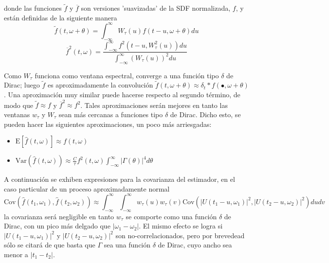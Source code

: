 \documentclass[12pt,a4paper]{mitthesis}
\newcommand{\intR}{\int_{-\infty}^{\infty}}
\newcommand{\dirac}{$\delta$  de Dirac}
\newcommand{\est}[1]{\widehat{ #1 }}
\newcommand{\E}[1]{\mathrm{E}\left[ #1 \right]}
\newcommand{\Var}[1]{\mathrm{Var}\left( #1 \right)}
\newcommand{\Cov}[1]{\mathrm{Cov}\left( #1 \right)}
\newcommand{\abso}[1]{\left| #1 \right|}
\begin{document}
donde las funciones $\widetilde{f}$ y $\overline{f}$ son versiones 'suavizadas' de la SDF 
normalizada, $f$, y est\'an definidas de la siguiente manera
\begin{equation*}
\widetilde{f}(t,\omega+\theta) = 
\intR W_{\tau}(u) f(t-u,\omega+\theta) du
\end{equation*}
\begin{equation*}
\overline{f}^{2} (t,\omega) =
\frac{\intR f^{2}\left(t-u,W_{\tau}^{2}(u)\right) du}
{\intR \left( W_{\tau}(u) \right)^{2} du}
\end{equation*}

Como $W_{\tau}$ funciona como ventana espectral, converge a una 
funci\'on tipo \dirac; luego $\widetilde{f}$ es aproximadamente la convoluci\'on 
$\widetilde{f}(t,\omega+\theta) \approx \delta_t \ast f(\bullet,\omega+\theta)$. 
Una aproximaci\'on muy similar 
puede hacerse respecto al segundo t\'ermino, de modo que $\widetilde{f}\approx f$ y 
$\overline{f}^{2}\approx f^{2}$.
Tales aproximaciones ser\'an mejores en tanto las ventanas $w_{\tau}$ y $W_{\tau}$ sean m\'as 
cercanas a funciones tipo \dirac.
Dicho esto, se pueden hacer las siguientes aproximaciones, un poco m\'as arriesgadas:
\begin{itemize}
\item $\displaystyle \E{\est{f}(t,\omega)} \approx f(t,\omega)$
\item $\displaystyle \Var{\est{f}(t,\omega)} \approx 
\frac{C}{\tau} f^{2}(t,\omega) \intR \abso{\Gamma (\theta)}^{4} d\theta$
\end{itemize}

A continuaci\'on se exhiben expresiones para la covarianza del estimador, en el caso particular
de un proceso aproximadamente normal
\begin{equation*}
\Cov{\est{f}(t_1,\omega_1) , \est{f}(t_2,\omega_2)} \approx \intR \intR
w_\tau (u) w_\tau(v) \Cov{ \abso{U(t_1-u,\omega_1)}^{2} , \abso{U(t_2-u,\omega_2)}^{2} }
du dv
\end{equation*}
la covarianza ser\'a negligible en tanto $w_\tau$ se comporte como una 
funci\'on \dirac, con un pico m\'as delgado que $\abso{\omega_1-\omega_2}$.
El mismo efecto se logra si $\abso{U(t_1-u,\omega_1)}^{2}$ y $\abso{U(t_2-u,\omega_2)}^{2}$ son 
no-correlacionados, pero por brevedead s\'olo se citar\'a de \cite{Priestley65} que basta que 
$\Gamma$ sea una funci\'on \dirac, cuyo ancho sea menor a $\abso{t_1-t_2}$.
\end{document}
